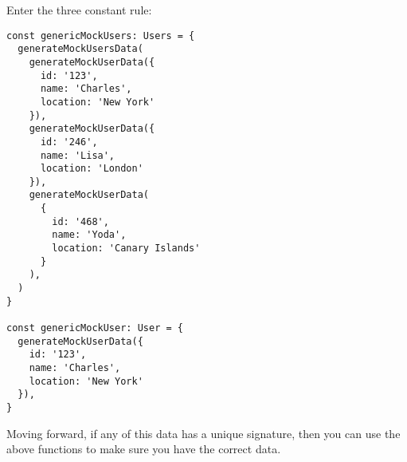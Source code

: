 Enter the three constant rule:

\begin{lstlisting}
const genericMockUsers: Users = {
  generateMockUsersData(
    generateMockUserData({
      id: '123',
      name: 'Charles',
      location: 'New York'
    }),
    generateMockUserData({
      id: '246',
      name: 'Lisa',
      location: 'London'
    }),
    generateMockUserData(
      {
        id: '468',
        name: 'Yoda',
        location: 'Canary Islands'
      }
    ),
  )
}

const genericMockUser: User = {
  generateMockUserData({
    id: '123',
    name: 'Charles',
    location: 'New York'
  }),
}
\end{lstlisting}

Moving forward, if any of this data has a unique signature, then you can use
the above functions to make sure you have the correct data.
